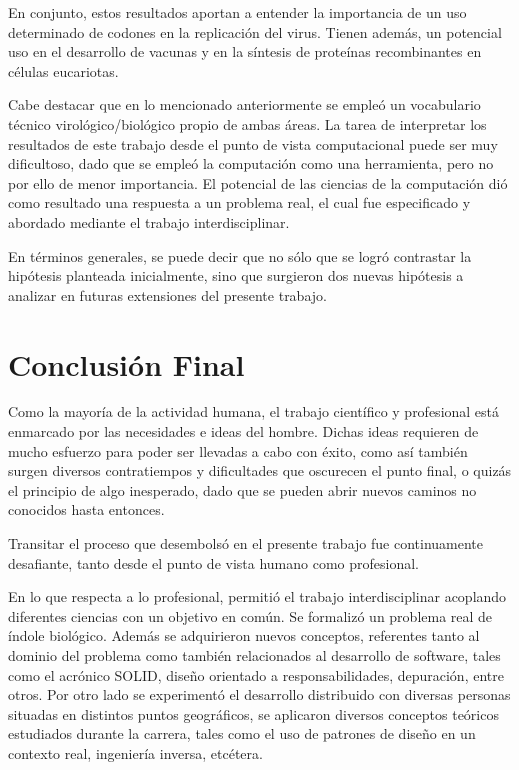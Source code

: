 \par En conjunto, estos resultados aportan a entender la importancia de un uso determinado de codones en la replicación del virus. Tienen además, un potencial uso en el desarrollo de vacunas y en la síntesis de proteínas recombinantes en células eucariotas. 

\par Cabe destacar que en lo mencionado anteriormente se empleó un vocabulario técnico virológico/biológico propio de ambas áreas. La tarea de interpretar los resultados de este trabajo desde el punto de vista computacional puede ser muy dificultoso, dado que se empleó la computación como una herramienta, pero no por ello de menor importancia. El potencial de las ciencias de la computación dió como resultado una respuesta a un problema real, el cual fue especificado y abordado mediante el trabajo interdisciplinar.  

\par En términos generales, se puede decir que no sólo que se logró contrastar la hipótesis planteada inicialmente, sino que surgieron dos nuevas hipótesis a analizar en futuras extensiones del presente trabajo.

\section{Conclusión Final}
\par Como la mayoría de la actividad humana, el trabajo científico y profesional está enmarcado por las necesidades e ideas del hombre. Dichas ideas requieren de mucho esfuerzo para poder ser llevadas a cabo con éxito, como así también surgen diversos contratiempos y dificultades que oscurecen el punto final, o quizás el principio de algo inesperado, dado que se pueden abrir nuevos caminos no conocidos hasta entonces.

\par Transitar el proceso que desembolsó en el presente trabajo fue continuamente desafiante, tanto desde el punto de vista humano como profesional.

\par En lo que respecta a lo profesional, permitió el trabajo interdisciplinar acoplando diferentes ciencias con un objetivo en común. Se formalizó un problema real de índole biológico. Además se adquirieron nuevos conceptos, referentes tanto al dominio del problema como también relacionados al desarrollo de software, tales como el acrónico SOLID, diseño orientado a responsabilidades, depuración, entre otros. Por otro lado se experimentó el desarrollo distribuido con diversas personas situadas en distintos puntos geográficos, se aplicaron diversos conceptos teóricos estudiados durante la carrera, tales como el uso de patrones de diseño en un contexto real, ingeniería inversa, etcétera. 

